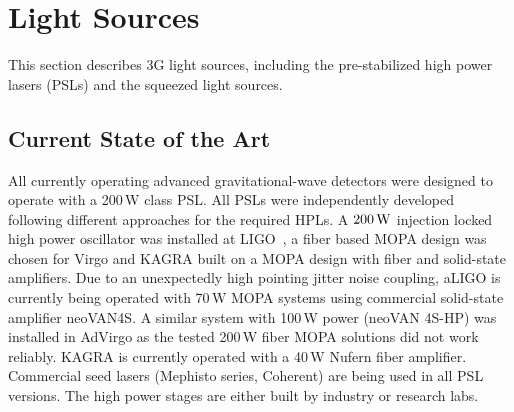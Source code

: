 
\chapter{Light Sources}
\label{sec:Light_sources}

This section describes \ac{3G}  light sources, including the pre-stabilized high power lasers (\acsp{PSL}) and the squeezed light sources. 

\section{Current State of the Art}
All currently operating advanced gravitational-wave detectors were designed to operate with a 200\,W class \ac{PSL}. All \acp{PSL} were independently developed following different approaches for the required \acp{HPL}. A $ 200\,{\rm W} $ injection locked high power oscillator was installed at \ac{LIGO}~\cite{Kwee:12}, a fiber based  \ac{MOPA} design was chosen for \ac{Virgo} and \ac{KAGRA} built on a \ac{MOPA}   design with fiber and solid-state amplifiers. Due to an unexpectedly high pointing jitter noise coupling, \ac{aLIGO} is currently being operated with 70\,W \ac{MOPA} systems using 
commercial solid-state amplifier \acs{neoVAN4S}. A similar system with 100\,W power (neoVAN 4S-HP) was installed in 
\ac{AdVirgo}
as the tested 200\,W fiber \ac{MOPA}   solutions did not work reliably. 
KAGRA is currently operated with a 40\,W \acs{Nufern} fiber amplifier. Commercial seed lasers (Mephisto series, Coherent) are being used in all \ac{PSL} versions. The high power stages are either built by industry or research labs. 

